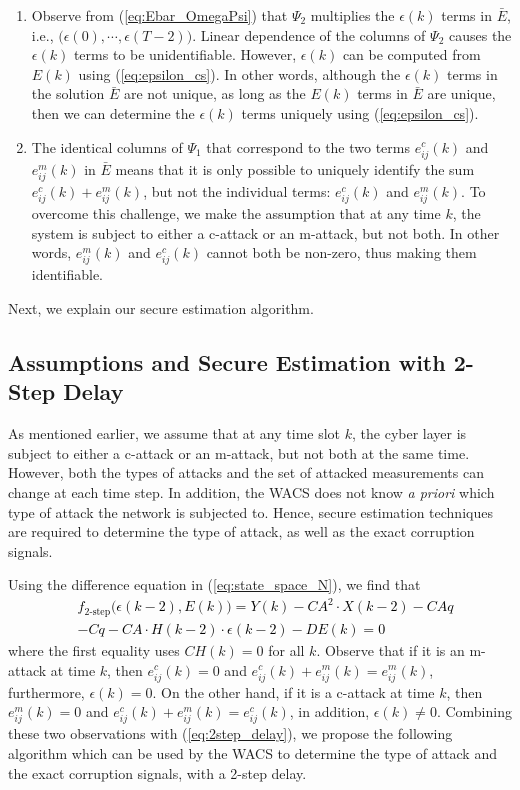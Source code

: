 \begin{enumerate}
\item Observe from (\ref{eq:Ebar_OmegaPsi}) that $\Psi_2$ multiplies the $\epsilon(k)$ terms in $\bar E$, i.e., $\big( \epsilon(0), \cdots, \epsilon(T-2) \big)$.
Linear dependence of the columns of $\Psi_2$ causes the $\epsilon(k)$ terms to be unidentifiable.
However, $\epsilon (k)$ can be computed from $E(k)$ using (\ref{eq:epsilon_cs}). In other words, although the $\epsilon(k)$ terms in the solution $\bar E$ are not unique, as long as the $E(k)$ terms in $\bar E$ are unique, then we can determine the $\epsilon (k)$ terms uniquely using (\ref{eq:epsilon_cs}).

\item The identical columns of $\Psi_1$ that correspond to the two terms $e^c_{ij}(k)$ and $e^m_{ij}(k)$ in $\bar E$ means that it is only possible to uniquely identify the sum $e^c_{ij}(k)+e^m_{ij}(k)$, but not the individual terms: $e^c_{ij}(k)$ and $e^m_{ij}(k)$. To overcome this challenge, we make the assumption that at any time $k$, the system is subject to either a c-attack or an m-attack, but not both. In other words, $e^m_{ij}(k)$ and $e^c_{ij}(k)$ cannot both be non-zero, thus making them identifiable.
\end{enumerate}
Next, we explain our secure estimation algorithm.


\subsection{Assumptions and Secure Estimation with 2-Step Delay}


As mentioned earlier, we assume that at any time slot $k$, the cyber layer is subject to either a c-attack or an m-attack, but not both at the same time.
However, both the types of attacks and the set of attacked measurements can change at each time step. In addition, the WACS does not know \textit{a priori} which type of attack the network is subjected to. Hence, secure estimation techniques are required to determine the type of attack, as well as the exact corruption signals.

Using the difference equation in (\ref{eq:state_space_N}), we find that
\textcolor{black}{
\begin{align}\label{eq:2step_delay}
&f_\text{2-step}\big (\epsilon(k-2), E(k) \big)  = Y(k) - CA^2\cdot X(k-2) - CAq  \nonumber\\
	&   - Cq - CA\cdot H(k-2)\cdot \epsilon(k-2)  - DE(k)= 0
\end{align}}
where the first equality uses $CH(k)=0$ for all $k$. Observe that if it is an m-attack at time $k$, then $e^c_{ij}(k) = 0$ and $e^c_{ij}(k) + e^m_{ij}(k) = e^m_{ij}(k)$, furthermore, $\epsilon(k) = 0$. On the other hand, if it is a c-attack at time $k$, then $e^m_{ij}(k) = 0$ and $e^c_{ij}(k) + e^m_{ij}(k) = e^c_{ij}(k)$, in addition, $\epsilon(k) \neq 0$.
Combining these two observations with (\ref{eq:2step_delay}), we propose the following algorithm which can be used by the WACS to determine the type of attack and the exact corruption signals, with a 2-step delay.

